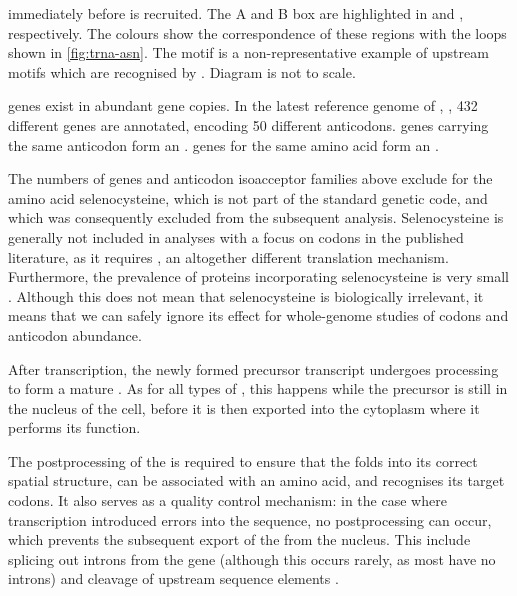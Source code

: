     {immediately before  is recruited. The A and B box are highlighted in
    \primaryname{} and \secondaryname{}, respectively. The colours show the
    correspondence of these regions with the loops shown in \cref{fig:trna-asn}.
    The  motif is a non-representative example of upstream motifs
    which are recognised by . Diagram is not to scale.}

\trna genes exist in abundant gene copies. In the latest reference genome of
\mmu,  \citep{Church:2009}, \num{432} different \trna genes are
annotated, encoding \num{50} different anticodons. \trna genes carrying the same
anticodon form an . \trna genes for the
same amino acid form an .

The numbers of \trna genes and anticodon isoacceptor families above exclude
\trna[s] for the amino acid selenocysteine, which is not part of the standard
genetic code, and which was consequently excluded from the subsequent analysis.
Selenocysteine is generally not included in analyses with a focus on codons in
the published literature, as it requires , an
altogether different translation mechanism. Furthermore, the prevalence of
proteins incorporating selenocysteine is very small \citep{Reeves:2009}.
Although this does not mean that selenocysteine is biologically irrelevant, it
means that we can safely ignore its effect for whole-genome studies of codons
and anticodon abundance.

After transcription, the newly formed precursor \trna transcript undergoes
processing to form a mature \trna. As for all types of \rna, this happens while
the precursor \trna is still in the nucleus of the cell, before it is then
exported into the cytoplasm where it performs its function.

The postprocessing of the \trna is required to ensure that the \trna folds into
its correct spatial structure, can be associated with an amino acid, and
recognises its target codons. It also serves as a quality control mechanism: in
the case where transcription introduced errors into the \trna sequence, no
postprocessing can occur, which prevents the subsequent export of the \trna from
the nucleus. This include splicing out introns from the \trna gene (although
this occurs rarely, as most \trna[s] have no introns) and cleavage of \fivep
upstream sequence elements \citep{Alberts:2002,Berg:2002}.

